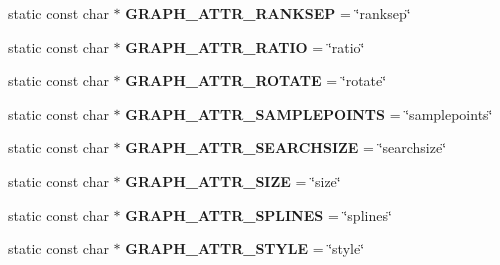\begin{DoxyCompactItemize}
\item 
static const char $\ast$ {\bfseries G\+R\+A\+P\+H\+\_\+\+A\+T\+T\+R\+\_\+\+R\+A\+N\+K\+S\+EP} = \char`\"{}ranksep\char`\"{}\hypertarget{classmemgraph_1_1_graphviz_attrs_a93f656580272abfd279c7e312338394c}{}\label{classmemgraph_1_1_graphviz_attrs_a93f656580272abfd279c7e312338394c}

\item 
static const char $\ast$ {\bfseries G\+R\+A\+P\+H\+\_\+\+A\+T\+T\+R\+\_\+\+R\+A\+T\+IO} = \char`\"{}ratio\char`\"{}\hypertarget{classmemgraph_1_1_graphviz_attrs_a60fca13a7f2ea4e1c0213a36365cd139}{}\label{classmemgraph_1_1_graphviz_attrs_a60fca13a7f2ea4e1c0213a36365cd139}

\item 
static const char $\ast$ {\bfseries G\+R\+A\+P\+H\+\_\+\+A\+T\+T\+R\+\_\+\+R\+O\+T\+A\+TE} = \char`\"{}rotate\char`\"{}\hypertarget{classmemgraph_1_1_graphviz_attrs_a4c8b44d8f2a1bc4a961bb37e0dcf3562}{}\label{classmemgraph_1_1_graphviz_attrs_a4c8b44d8f2a1bc4a961bb37e0dcf3562}

\item 
static const char $\ast$ {\bfseries G\+R\+A\+P\+H\+\_\+\+A\+T\+T\+R\+\_\+\+S\+A\+M\+P\+L\+E\+P\+O\+I\+N\+TS} = \char`\"{}samplepoints\char`\"{}\hypertarget{classmemgraph_1_1_graphviz_attrs_acbfefc50b45ec13ea7048b3b4468077c}{}\label{classmemgraph_1_1_graphviz_attrs_acbfefc50b45ec13ea7048b3b4468077c}

\item 
static const char $\ast$ {\bfseries G\+R\+A\+P\+H\+\_\+\+A\+T\+T\+R\+\_\+\+S\+E\+A\+R\+C\+H\+S\+I\+ZE} = \char`\"{}searchsize\char`\"{}\hypertarget{classmemgraph_1_1_graphviz_attrs_abc738247f254e75f808ebf59594334ed}{}\label{classmemgraph_1_1_graphviz_attrs_abc738247f254e75f808ebf59594334ed}

\item 
static const char $\ast$ {\bfseries G\+R\+A\+P\+H\+\_\+\+A\+T\+T\+R\+\_\+\+S\+I\+ZE} = \char`\"{}size\char`\"{}\hypertarget{classmemgraph_1_1_graphviz_attrs_a4bc082ab4e056adab83c588687042b94}{}\label{classmemgraph_1_1_graphviz_attrs_a4bc082ab4e056adab83c588687042b94}

\item 
static const char $\ast$ {\bfseries G\+R\+A\+P\+H\+\_\+\+A\+T\+T\+R\+\_\+\+S\+P\+L\+I\+N\+ES} = \char`\"{}splines\char`\"{}\hypertarget{classmemgraph_1_1_graphviz_attrs_ace4adc723003c4c2532bbcd4bccb6908}{}\label{classmemgraph_1_1_graphviz_attrs_ace4adc723003c4c2532bbcd4bccb6908}

\item 
static const char $\ast$ {\bfseries G\+R\+A\+P\+H\+\_\+\+A\+T\+T\+R\+\_\+\+S\+T\+Y\+LE} = \char`\"{}style\char`\"{}\hypertarget{classmemgraph_1_1_graphviz_attrs_a182503a61b44f159708269c0c01ad5c5}{}\label{classmemgraph_1_1_graphviz_attrs_a182503a61b44f159708269c0c01ad5c5}


\end{DoxyCompactItemize}
